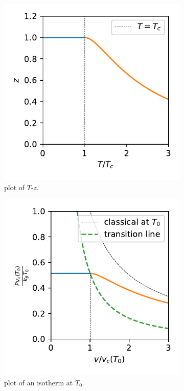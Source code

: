 \begin{itemize}
	\begin{figure}[H]
		\centering
		\begin{subfigure}{0.4\linewidth}
			\centering
			\includegraphics[scale=0.8]{figures/plot of T-z.pdf}
			\caption{plot of $T$-$z$.}
			\label{figure 7.2 (a)}
		\end{subfigure}
		\begin{subfigure}{0.4\linewidth}
			\centering
			\includegraphics[scale=0.8]{figures/plot of an isotherm at T_0.pdf}
			\caption{plot of an isotherm at $T_0$.}
			\label{figure 7.2 (b)}
		\end{subfigure}
		\caption{}
	\end{figure}
\end{itemize}

